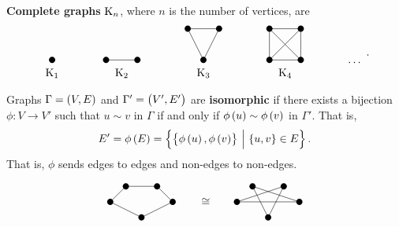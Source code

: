 \begin{example*}
\textbf{Complete graphs} $ \mathrm{K}_n $, where $ n $ is the number of vertices, are
$$
\begin{array}{ccccccccc}
\begin{tikzpicture}
\fill (0, 0) circle (0.1);
\end{tikzpicture}
& \qquad &
\begin{tikzpicture}
\fill (0, 0) circle (0.1);
\fill (1, 0) circle (0.1);
\draw (0, 0) to (1, 0);
\end{tikzpicture}
& \qquad &
\begin{tikzpicture}
\fill (0, 0) circle (0.1);
\fill (1, 0) circle (0.1);
\fill (0.5, -1) circle (0.1);
\draw (0, 0) to (1, 0);
\draw (0, 0) to (0.5, -1);
\draw (1, 0) to (0.5, -1);
\end{tikzpicture}
& \qquad &
\begin{tikzpicture}
\fill (0, 0) circle (0.1);
\fill (1, 0) circle (0.1);
\fill (0, -1) circle (0.1);
\fill (1, -1) circle (0.1);
\draw (0, 0) to (1, 0);
\draw (0, 0) to (0, -1);
\draw (0, 0) to (1, -1);
\draw (1, 0) to (0, -1);
\draw (1, 0) to (1, -1);
\draw (0, -1) to (1, -1);
\end{tikzpicture}
& \qquad & \dots \\
\K_1 & & \K_2 & & \K_3 & & \K_4 & &
\end{array}.
$$
\end{example*}

\pagebreak

\begin{definition*}
Graphs $ \Gamma = \br{V, E} $ and $ \Gamma' = \br{V', E'} $ are \textbf{isomorphic} if there exists a bijection $ \phi : V \to V' $ such that $ u \sim v $ in $ \Gamma $ if and only if $ \phi\br{u} \sim \phi\br{v} $ in $ \Gamma' $. That is,
$$ E' = \phi\br{E} = \cbr{\cbr{\phi\br{u}, \phi\br{v}} \st \cbr{u, v} \in E}. $$
That is, $ \phi $ sends edges to edges and non-edges to non-edges.
\end{definition*}

\begin{example*}
$$
\begin{tikzpicture}
\fill (0, 0) circle (0.1);
\fill (1, 0) circle (0.1);
\fill (-0.5, -0.5) circle (0.1);
\fill (1.5, -0.5) circle (0.1);
\fill (0.5, -1) circle (0.1);
\draw (0, 0) to (1, 0);
\draw (0, 0) to (-0.5, -0.5);
\draw (1, 0) to (1.5, -0.5);
\draw (-0.5, -0.5) to (0.5, -1);
\draw (1.5, -0.5) to (0.5, -1);
\end{tikzpicture}
\qquad
\begin{tikzpicture}
\draw (-1.5, -0.5) node{$ \cong $};
\fill (0, 0) circle (0.1);
\fill (1, 0) circle (0.1);
\fill (-0.5, -0.5) circle (0.1);
\fill (1.5, -0.5) circle (0.1);
\fill (0.5, -1) circle (0.1);
\draw (0, 0) to (0.5, -1);
\draw (0, 0) to (1.5, -0.5);
\draw (1, 0) to (-0.5, -0.5);
\draw (1, 0) to (0.5, -1);
\draw (-0.5, -0.5) to (1.5, -0.5);
\end{tikzpicture}
$$
\end{example*}

